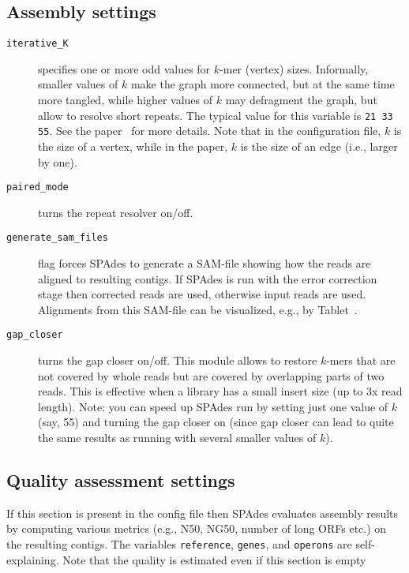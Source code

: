 \documentclass{article}
\def\spades{SPAdes}
\begin{document}
\subsection{Assembly settings}\label{subsec:assembly}
\begin{description}
\item[{\tt iterative\_K}] specifies one or more odd values for $k$-mer (vertex) sizes.  Informally, smaller values of $k$ make the graph more connected,
but at the same time more tangled, while higher values of $k$ may defragment the graph, but allow to resolve short repeats.
The typical value for this variable is {\tt 21 33 55}. See the paper~\cite{main} for more details.
Note that in the configuration file, $k$ is the size of a vertex, while in the paper, $k$ is the size of an edge (i.e., larger by one).

\item[{\tt paired\_mode}] turns the repeat resolver on/off.

\item[{\tt generate\_sam\_files}] flag forces {\spades} to generate a SAM-file
showing how the reads are aligned to resulting contigs. If {\spades}
is run with the error correction stage then corrected reads are used,
otherwise input reads are used. Alignments from this SAM-file
can be visualized, e.g., by Tablet~\cite{tablet}.

\item[{\tt gap\_closer}] turns the gap closer on/off. This module allows to restore $k$-mers that are not covered by whole reads
but are covered by overlapping parts of two reads. This is effective when a library has a small insert size (up to 3x read length).
Note: you can speed up {\spades} run by setting just one value of $k$ (say, 55) and turning the gap closer on
(since gap closer can lead to quite the same results as running with several smaller values of $k$).
\end{description}

\subsection{Quality assessment settings}
If this section is present in the config file then
{\spades} evaluates assembly results by computing various metrics (e.g., N50, NG50, number of long ORFs etc.) on the resulting contigs.
The variables {\tt reference}, {\tt genes}, and {\tt operons} are self-explaining.
Note that the quality is estimated even if this section is empty
\end{document}
